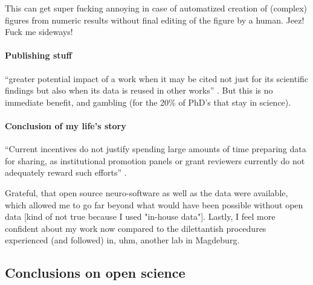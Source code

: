 
%
This can get super fucking annoying in case of automatized creation of (complex)
figures from numeric results without final editing of the figure by a human.
Jeez! Fuck me sideways!



\paragraph{Publishing stuff}



%
``greater potential impact of a work when it may be cited not just for its
scientific findings but also when its data is reused in other works''
\citep{nichols2017best}.
%
But this is no immediate benefit, and gambling (for the 20\% of PhD's that stay
in science).


\paragraph{Conclusion of my life's story}

``Current incentives do not justify spending large amounts of time preparing
data for sharing, as institutional promotion panels or grant reviewers currently
do not adequately reward such efforts'' \citep{nichols2017best}.

Grateful, that open source neuro-software as well as the data were available,
which allowed me to go far beyond what would have been possible without open
data [kind of not true because I used "in-house data"].
%
Lastly, I feel more confident about my work now compared to the dilettantish
procedures experienced (and followed) in, uhm, another lab in Magdeburg.



\subsection{Conclusions on open science}


